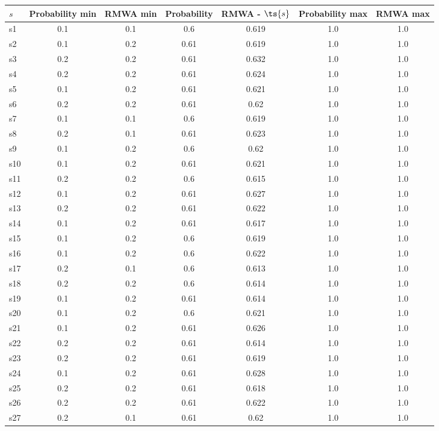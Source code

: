 \documentclass{article}
\begin{document}
\noindent\begin{tabular}{|l|c|c|c|c|c|c|}
\hline
$s$& Probability min & RMWA min & Probability & RMWA - $\ts{s}$ & Probability max & RMWA max\\
\hline
s1 &0.1 & 0.1 & 0.6 & 0.619 & 1.0 & 1.0\\
\hline
s2 &0.1 & 0.2 & 0.61 & 0.619 & 1.0 & 1.0\\
\hline
s3 &0.2 & 0.2 & 0.61 & 0.632 & 1.0 & 1.0\\
\hline
s4 &0.2 & 0.2 & 0.61 & 0.624 & 1.0 & 1.0\\
\hline
s5 &0.1 & 0.2 & 0.61 & 0.621 & 1.0 & 1.0\\
\hline
s6 &0.2 & 0.2 & 0.61 & 0.62 & 1.0 & 1.0\\
\hline
s7 &0.1 & 0.1 & 0.6 & 0.619 & 1.0 & 1.0\\
\hline
s8 &0.2 & 0.1 & 0.61 & 0.623 & 1.0 & 1.0\\
\hline
s9 &0.1 & 0.2 & 0.6 & 0.62 & 1.0 & 1.0\\
\hline
s10 &0.1 & 0.2 & 0.61 & 0.621 & 1.0 & 1.0\\
\hline
s11 &0.2 & 0.2 & 0.6 & 0.615 & 1.0 & 1.0\\
\hline
s12 &0.1 & 0.2 & 0.61 & 0.627 & 1.0 & 1.0\\
\hline
s13 &0.2 & 0.2 & 0.61 & 0.622 & 1.0 & 1.0\\
\hline
s14 &0.1 & 0.2 & 0.61 & 0.617 & 1.0 & 1.0\\
\hline
s15 &0.1 & 0.2 & 0.6 & 0.619 & 1.0 & 1.0\\
\hline
s16 &0.1 & 0.2 & 0.6 & 0.622 & 1.0 & 1.0\\
\hline
s17 &0.2 & 0.1 & 0.6 & 0.613 & 1.0 & 1.0\\
\hline
s18 &0.2 & 0.2 & 0.6 & 0.614 & 1.0 & 1.0\\
\hline
s19 &0.1 & 0.2 & 0.61 & 0.614 & 1.0 & 1.0\\
\hline
s20 &0.1 & 0.2 & 0.6 & 0.621 & 1.0 & 1.0\\
\hline
s21 &0.1 & 0.2 & 0.61 & 0.626 & 1.0 & 1.0\\
\hline
s22 &0.2 & 0.2 & 0.61 & 0.614 & 1.0 & 1.0\\
\hline
s23 &0.2 & 0.2 & 0.61 & 0.619 & 1.0 & 1.0\\
\hline
s24 &0.1 & 0.2 & 0.61 & 0.628 & 1.0 & 1.0\\
\hline
s25 &0.2 & 0.2 & 0.61 & 0.618 & 1.0 & 1.0\\
\hline
s26 &0.2 & 0.2 & 0.61 & 0.622 & 1.0 & 1.0\\
\hline
s27 &0.2 & 0.1 & 0.61 & 0.62 & 1.0 & 1.0\\

\end{tabular}
\end{document}
